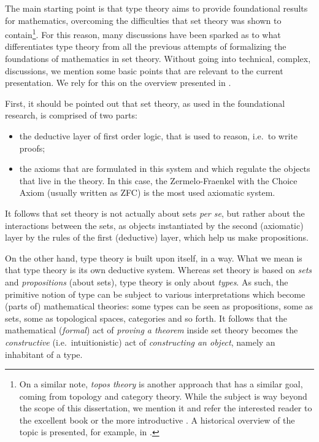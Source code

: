 The main starting point is that type theory aims to provide foundational
results for mathematics, overcoming the difficulties that set theory was shown
to contain\footnote{On a similar note, \emph{topos theory} is another approach
  that has a similar goal, coming from topology and category theory. While the
  subject is way beyond the scope of this dissertation, we mention it and refer
  the interested reader to the excellent book \cite{macsh} or the more introductive
  \cite{goldb}. A historical overview of the topic is presented, for example,
  in \cite{abuse}.}. For this reason, many discussions have been sparked as to
what differentiates type theory from all the previous attempts of formalizing the
foundations of mathematics in set theory. Without going into technical,
complex, discussions, we mention some basic points that are relevant to the
current presentation. We rely for this on the overview presented in
\cite[\S 1.1]{hott}.

First, it should be pointed out that set theory, as used in the foundational
research, is comprised of two parts:
\begin{itemize}
\item the deductive layer of first order logic, that is used to reason, i.e.\
  to write proofs;
\item the axioms that are formulated in this system and which regulate
  the objects that live in the theory. In this case, the Zermelo-Fraenkel
  with the Choice Axiom (usually written as ZFC) is the most used
  axiomatic system.
\end{itemize}
It follows that set theory is not actually about sets \emph{per se}, but
rather about the interactions between the sets, as objects instantiated
by the second (axiomatic) layer by the rules of the first (deductive) layer,
which help us make propositions.

On the other hand, type theory is built upon itself, in a way. What we
mean is that type theory is its own deductive system. Whereas set theory
is based on \emph{sets} and \emph{propositions} (about sets), type theory
is only about \emph{types}. As such, the primitive notion of type can be
subject to various interpretations which become (parts of) mathematical
theories: some types can be seen as propositions, some as sets, some as
topological spaces, categories and so forth. It follows that the mathematical
(\emph{formal}) act of \emph{proving a theorem} inside set theory becomes the
\emph{constructive} (i.e.\ intuitionistic) act of \emph{constructing an object},
namely an inhabitant of a type.

